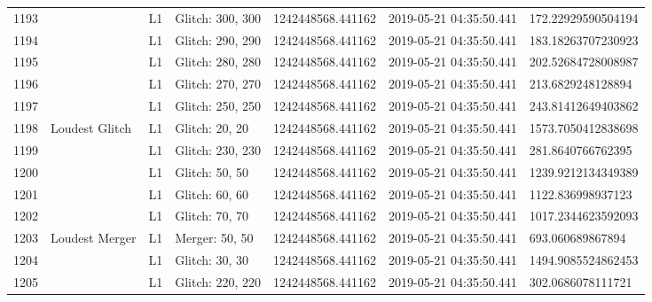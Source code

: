 \begin{longtable}{lllllll}
1193 &                                                    &       L1 &  Glitch: 300, 300 &   1242448568.441162 &  2019-05-21 04:35:50.441 &  172.22929590504194 \\
1194 &                                                    &       L1 &  Glitch: 290, 290 &   1242448568.441162 &  2019-05-21 04:35:50.441 &  183.18263707230923 \\
1195 &                                                    &       L1 &  Glitch: 280, 280 &   1242448568.441162 &  2019-05-21 04:35:50.441 &  202.52684728008987 \\
1196 &                                                    &       L1 &  Glitch: 270, 270 &   1242448568.441162 &  2019-05-21 04:35:50.441 &   213.6829248128894 \\
1197 &                                                    &       L1 &  Glitch: 250, 250 &   1242448568.441162 &  2019-05-21 04:35:50.441 &  243.81412649403862 \\
1198 &                                     Loudest Glitch &       L1 &    Glitch: 20, 20 &   1242448568.441162 &  2019-05-21 04:35:50.441 &  1573.7050412838698 \\
1199 &                                                    &       L1 &  Glitch: 230, 230 &   1242448568.441162 &  2019-05-21 04:35:50.441 &   281.8640766762395 \\
1200 &                                                    &       L1 &    Glitch: 50, 50 &   1242448568.441162 &  2019-05-21 04:35:50.441 &  1239.9212134349389 \\
1201 &                                                    &       L1 &    Glitch: 60, 60 &   1242448568.441162 &  2019-05-21 04:35:50.441 &   1122.836998937123 \\
1202 &                                                    &       L1 &    Glitch: 70, 70 &   1242448568.441162 &  2019-05-21 04:35:50.441 &  1017.2344623592093 \\
1203 &                                     Loudest Merger &       L1 &    Merger: 50, 50 &   1242448568.441162 &  2019-05-21 04:35:50.441 &    693.060689867894 \\
1204 &                                                    &       L1 &    Glitch: 30, 30 &   1242448568.441162 &  2019-05-21 04:35:50.441 &  1494.9085524862453 \\
1205 &                                                    &       L1 &  Glitch: 220, 220 &   1242448568.441162 &  2019-05-21 04:35:50.441 &   302.0686078111721 \\

\end{longtable}
